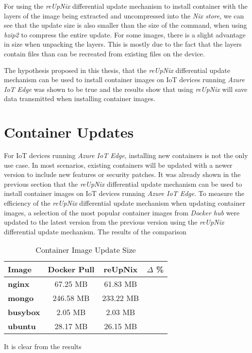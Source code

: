 For using the \textit{reUpNix} differential update mechanism to install container
with the layers of the image being extracted and uncompressed into the
\textit{Nix store}, we can see that the update size is also smaller
than the size of the  command, when using \textit{bzip2} to
compress the entire update. For some images, there is a slight advantage in size
when
unpacking the layers. This is mostly due to the fact that the layers
contain files than can be recreated from existing files on the device.

The hypothesis proposed in this thesis, that the \textit{reUpNix} differential
update mechanism can be used to install container images on \ac{IoT} devices
running \textit{Azure IoT Edge} was shown to be true and the results show that
using \textit{reUpNix} will save data transmitted when installing container images.


\section{Container Updates}
For \ac{IoT} devices running \textit{Azure IoT Edge}, installing new containers
is not the only use case. In most scenarios, existing containers will be updated
with a newer version to include new features or security patches. It was already
shown in the previous section that the \textit{reUpNix} differential update mechanism
can be used to install container images on \ac{IoT} devices running \textit{Azure IoT Edge}.
To measure the efficiency of the \textit{reUpNix} differential update mechanism
when updating container images, a selection of the most popular container images
from \textit{Docker hub} were updated to the latest version from the previous version
using the \textit{reUpNix} differential update mechanism. The results of the
comparison

\begin{table}[H]
	\centering
	\begin{tabular}{l|c|c|c}
	\toprule
	 Image & Docker Pull & reUpNix & $\Delta$ \% \\
	\midrule
    \textbf{nginx} & 67.25 MB & 61.83 MB & \color{ba-green}{- 8.0 \%} \\
    \textbf{mongo} & 246.58 MB & 233.22 MB & \color{ba-green}{- 5.6 \%} \\
    \textbf{busybox} & 2.05 MB & 2.03 MB & \color{ba-green}{- 0.9 \%} \\
    \textbf{ubuntu} & 28.17 MB & 26.15 MB & \color{ba-green}{- 6.3 \%} \\
	\bottomrule
	\end{tabular}
	\caption{Container Image Update Size}
	\label{tab:container-update-size}
\end{table}

\noindent
It is clear from the results
